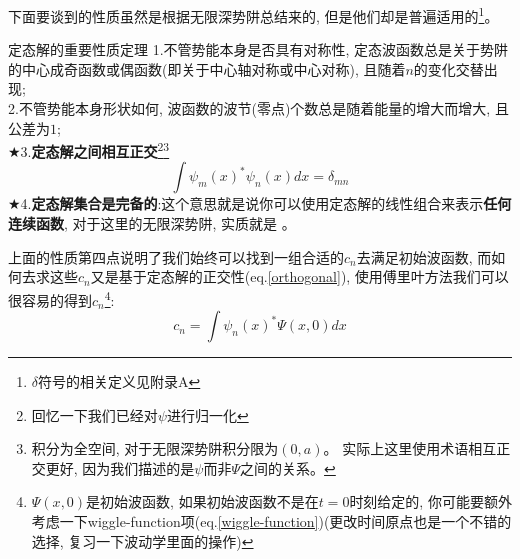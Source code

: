\documentclass[a4paper,zihao=-4,linespread=1]{ctexrep}
\newenvironment{lequation}{\large\begin{equation}}{\end{equation}}
\begin{document}
    下面要谈到的性质虽然是根据无限深势阱总结来的, 但是他们却是普遍适用的\footnote{$\delta$符号的相关定义见附录A}。
    \begin{theorem}{定态解的重要性质定理}
        1.不管势能本身是否具有对称性, 定态波函数总是关于势阱的中心成奇函数或偶函数(即关于中心轴对称或中心对称), 且随着$n$的变化交替出现;\\
        2.不管势能本身形状如何, 波函数的波节(零点)个数总是随着能量的增大而增大, 且公差为$1$;\\
        $\bigstar$3.\textbf{定态解之间相互正交}\footnote{回忆一下我们已经对$\psi$进行归一化}\footnote{积分为全空间, 对于无限深势阱积分限为$(0,a)$。
        实际上这里使用术语相互正交更好, 因为我们描述的是$\psi$而非$\Psi$之间的关系。}
        \begin{lequation}
            \label{orthogonal}
            \int \psi_m(x)^*\psi_n(x) dx=\delta_{mn}
        \end{lequation} 
        $\bigstar$4.\textbf{定态解集合是完备的}:这个意思就是说你可以使用定态解的线性组合来表示\textbf{任何连续函数}, 对于这里的无限深势阱, 实质就是
        。
    \end{theorem}
    上面的性质第四点说明了我们始终可以找到一组合适的$c_n$去满足初始波函数, 而如何去求这些$c_n$又是基于定态解的正交性(eq.\ref{orthogonal}), 使用傅里叶方法我们可以
    很容易的得到$c_n$\footnote{$\Psi(x,0)$是初始波函数, 如果初始波函数不是在$t=0$时刻给定的, 你可能要额外考虑一下wiggle-function项(eq.\ref{wiggle-function})(更改时间原点也是一个不错的选择, 复习一下波动学里面的操作)}:
    \begin{lequation}
        \boxed{
            c_n=\int \psi_n(x)^*\Psi(x,0) dx
        }
    \end{lequation}
\end{document}
